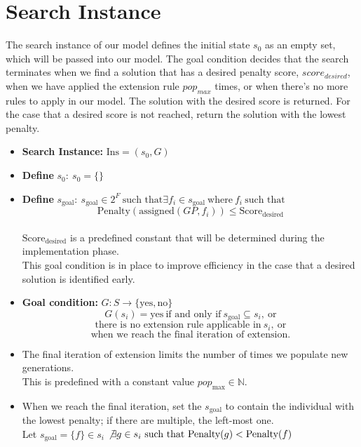 \documentclass[12 pt]{article}        	%
\begin{document}
\section{Search Instance}
The search instance of our model defines the initial state $s_0$ as an empty set, which will be passed
into our model. The goal condition decides that the search terminates when we find a solution that
has a desired penalty score, $score_{desired}$, when we have applied the extension rule $pop_{max}$ times, or when there’s no more rules to apply in our model. The solution with the desired score is returned.
For the case that a desired score is not reached, return the solution with the lowest penalty.
\begin{itemize}
    \item \textbf{Search Instance:} $\text{Ins} = (s_0, G)$
    \item \textbf{Define } $s_0: \ s_0 = \{\}$
    \item \textbf{Define } $s_{\text{goal}}: \ s_{\text{goal}} \in 2^F \ \text{such that}  \exists f_i \in s_{\text{goal}} \ \text{where} \ f_i \ \text{such that}$
    \[
    \text{Penalty}(\text{assigned}(GP, f_i)) \leq \text{Score}_{\text{desired}}
    \]
    \\
    $\text{Score}_{\text{desired}} $ is a predefined constant that will be determined during the implementation phase. \\ This goal condition is in place to improve efficiency in the case that a desired solution is
    identified early.
    
    \item \textbf{Goal condition:} $G: S \to \{\text{yes}, \text{no}\}$
    \[
    G(s_i) = \text{yes} \ \text{if and only if} \ s_{\text{goal}} \subseteq s_i, \ \text{or}
    \]
    \[
    \text{there is no extension rule applicable in} \ s_i, \ \text{or}
    \]
    \[
    \text{when we reach the final iteration of extension.}
    \]
    \item The final iteration of extension limits the number of times we populate new generations. 
    \\ This is predefined with a constant value  $pop_{\text{max}} \in \mathbb{N}$.
    
    \item When we reach the final iteration, set the  $s_{\text{goal}}$ to contain the individual with the lowest penalty; if there are multiple, the left-most one. \\ Let $s_{\text{goal}} = \{f\} \in s_i$  
    $\not\exists g \in s_i \ \text{such that Penalty}(g) < \text{Penalty}(f)$  
    
\end{itemize}
\end{document}
